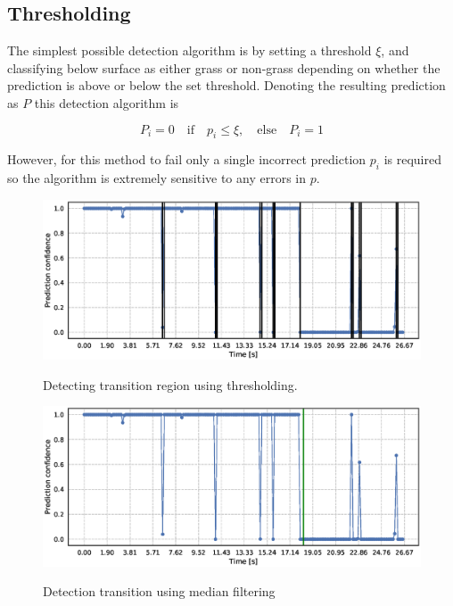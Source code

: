\subsection{Thresholding}

The simplest possible detection algorithm is by setting a threshold $\xi$, and classifying below surface as either grass or non-grass depending on whether the prediction is above or below the set threshold. Denoting the resulting prediction as $P$ this detection algorithm is 

\begin{equation}
	P_i=0 \quad\text{if}\quad p_i\leq\xi, \quad
	\text{else} \quad P_i=1
\end{equation}

However, for this method to fail only a single incorrect prediction $p_i$ is required so the algorithm is extremely sensitive to any errors in $p$.

\begin{figure}
	\includegraphics[scale=0.5]{figs_temp/detect_thresh}
	\label{fig:detect_thresh}
	\caption{Detecting transition region using thresholding.}
\end{figure}

\begin{figure}
	\includegraphics[scale=0.5]{figs_temp/detect_median}
	\label{fig:detect_median}
	\caption{Detection transition using median filtering}
\end{figure}

